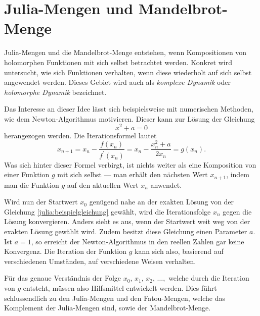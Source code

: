 %
%
%
%
\chapter{Julia-Mengen und Mandelbrot-Menge\label{chapter:julia}}
\begin{refsection}

\noindent
Julia-Mengen und die Mandelbrot-Menge entstehen, wenn Kompositionen von holomorphen Funktionen mit sich selbst betrachtet werden.
Konkret wird untersucht, wie sich Funktionen verhalten, wenn diese wiederholt auf sich selbst angewendet werden.
Dieses Gebiet wird auch als \emph{komplexe Dynamik} oder \emph{holomorphe Dynamik} bezeichnet.
%
%
%
%

Das Interesse an dieser Idee lässt sich beispielsweise mit numerischen Methoden, wie dem Newton-Algorithmus motivieren.
%
Dieser kann zur Lösung der Gleichung
\begin{equation}
    x^2 + a = 0
    \label{julia:beispielgleichung}
\end{equation}
herangezogen werden.
Die Iterationsformel lautet
\begin{equation}
    x_{n + 1} = x_n - \frac{f(x_n)}{f^\prime(x_n)} = x_n - \frac{x_n^2 + a}{2x_n} = g(x_n).
    \label{julia:newton_alg}
\end{equation}
Was sich hinter dieser Formel verbirgt, ist nichts weiter als eine Komposition von einer Funktion $g$ mit sich selbst --- man erhält den nächsten Wert $x_{n + 1}$, indem man die Funktion $g$ auf den aktuellen Wert $x_n$ anwendet.

Wird nun der Startwert $x_0$ genügend nahe an der exakten Lösung von der Gleichung \eqref{julia:beispielgleichung} gewählt, wird die Iterationsfolge $x_n$ gegen die Lösung konvergieren.
Anders sieht es aus, wenn der Startwert weit weg von der exakten Lösung gewählt wird.
Zudem besitzt diese Gleichung einen Parameter $a$.
Ist $a = 1$, so erreicht der Newton-Algorithmus in den reellen Zahlen gar keine Konvergenz.
Die Iteration der Funktion $g$ kann sich also, basierend auf verschiedenen Umständen, auf verschiedene Weisen verhalten.

Für das genaue Verständnis der Folge $x_0,\, x_1,\, x_2,\, \ldots,$ welche durch die Iteration von $g$ entsteht, müssen also Hilfsmittel entwickelt werden.
Dies führt schlussendlich zu den Julia-Mengen und den Fatou-Mengen, welche das Komplement der Julia-Mengen sind, sowie der Mandelbrot-Menge.


\end{refsection}

